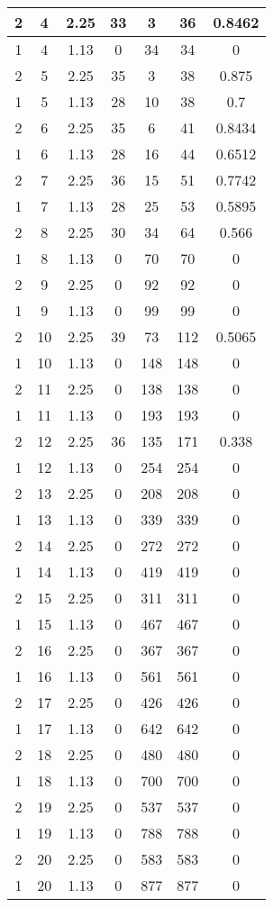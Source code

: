 \documentclass[letterpaper, 12pt]{article}
\begin{document}
\begin{longtable}{|c|c|c|c|c|c|c|}
\hline
2 & 4 & 2.25 & 33 & 3 & 36 & 0.8462 \\
\hline
1 & 4 & 1.13 & 0 & 34 & 34 & 0 \\
\hline
2 & 5 & 2.25 & 35 & 3 & 38 & 0.875 \\
\hline
1 & 5 & 1.13 & 28 & 10 & 38 & 0.7 \\
\hline
2 & 6 & 2.25 & 35 & 6 & 41 & 0.8434 \\
\hline
1 & 6 & 1.13 & 28 & 16 & 44 & 0.6512 \\
\hline
2 & 7 & 2.25 & 36 & 15 & 51 & 0.7742 \\
\hline
1 & 7 & 1.13 & 28 & 25 & 53 & 0.5895 \\
\hline
2 & 8 & 2.25 & 30 & 34 & 64 & 0.566 \\
\hline
1 & 8 & 1.13 & 0 & 70 & 70 & 0 \\
\hline
2 & 9 & 2.25 & 0 & 92 & 92 & 0 \\
\hline
1 & 9 & 1.13 & 0 & 99 & 99 & 0 \\
\hline
2 & 10 & 2.25 & 39 & 73 & 112 & 0.5065 \\
\hline
1 & 10 & 1.13 & 0 & 148 & 148 & 0 \\
\hline
2 & 11 & 2.25 & 0 & 138 & 138 & 0 \\
\hline
1 & 11 & 1.13 & 0 & 193 & 193 & 0 \\
\hline
2 & 12 & 2.25 & 36 & 135 & 171 & 0.338 \\
\hline
1 & 12 & 1.13 & 0 & 254 & 254 & 0 \\
\hline
2 & 13 & 2.25 & 0 & 208 & 208 & 0 \\
\hline
1 & 13 & 1.13 & 0 & 339 & 339 & 0 \\
\hline
2 & 14 & 2.25 & 0 & 272 & 272 & 0 \\
\hline
1 & 14 & 1.13 & 0 & 419 & 419 & 0 \\
\hline
2 & 15 & 2.25 & 0 & 311 & 311 & 0 \\
\hline
1 & 15 & 1.13 & 0 & 467 & 467 & 0 \\
\hline
2 & 16 & 2.25 & 0 & 367 & 367 & 0 \\
\hline
1 & 16 & 1.13 & 0 & 561 & 561 & 0 \\
\hline
2 & 17 & 2.25 & 0 & 426 & 426 & 0 \\
\hline
1 & 17 & 1.13 & 0 & 642 & 642 & 0 \\
\hline
2 & 18 & 2.25 & 0 & 480 & 480 & 0 \\
\hline
1 & 18 & 1.13 & 0 & 700 & 700 & 0 \\
\hline
2 & 19 & 2.25 & 0 & 537 & 537 & 0 \\
\hline
1 & 19 & 1.13 & 0 & 788 & 788 & 0 \\
\hline
2 & 20 & 2.25 & 0 & 583 & 583 & 0 \\
\hline
1 & 20 & 1.13 & 0 & 877 & 877 & 0 \\
\hline
\end{longtable}
\end{document}
